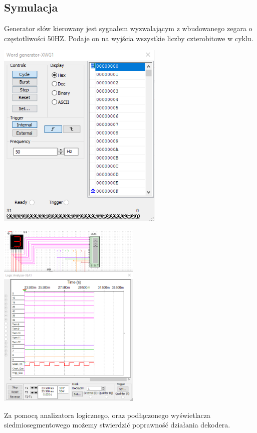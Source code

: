 \documentclass{article}
\begin{document}
        \subsection{Symulacja}
            Generator słów kierowany jest sygnałem wyzwalającym z wbudowanego zegara o częstotliwości 50HZ. Podaje on na wyjścia wszystkie liczby czterobitowe w cyklu. 
            \begin{center}
                \includegraphics[height=9cm]{reports/img/Z1C_gen.png}\\
            \end{center}
            \begin{center}
                \includegraphics[height=9cm]{reports/img/Z1C_analize.png}\\
            \end{center}
            Za pomocą analizatora logicznego, oraz podłączonego wyświetlacza siedmiosegmentowego możemy stwierdzić poprawność działania dekodera.
\end{document}
